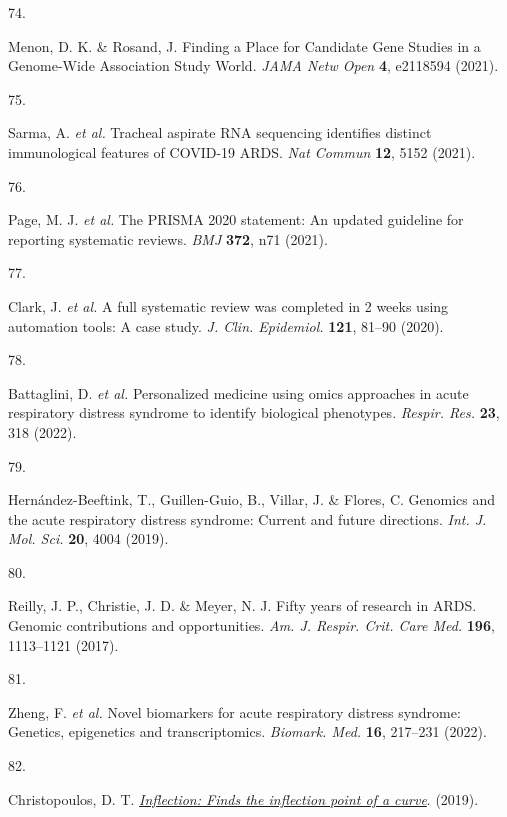 \documentclass[
  11,
  a4paper,
]{article}
\newlength{\cslhangindent}
\newlength{\csllabelwidth}
\newlength{\cslentryspacingunit} %
\newenvironment{CSLReferences}[2] %
 {%
  \setlength{\parindent}{0pt}
  \ifodd #1
  \let\oldpar\par
  \def\par{\hangindent=\cslhangindent\oldpar}
  \fi
  \setlength{\parskip}{#2\cslentryspacingunit}
 }%
 {}
\newcommand{\CSLLeftMargin}[1]{\parbox[t]{\csllabelwidth}{#1}}
\newcommand{\CSLRightInline}[1]{\parbox[t]{\linewidth - \csllabelwidth}{#1}\break}
\begin{document}
\begin{CSLReferences}{0}{0}
\leavevmode{}%
\CSLLeftMargin{74. }%
\CSLRightInline{Menon, D. K. \& Rosand, J. {{F}inding a {P}lace for
{C}andidate {G}ene {S}tudies in a {G}enome-{W}ide {A}ssociation {S}tudy
{W}orld}. \emph{JAMA Netw Open} \textbf{4}, e2118594 (2021).}

\leavevmode{}%
\CSLLeftMargin{75. }%
\CSLRightInline{Sarma, A. \emph{et al.} {{T}racheal aspirate {R}{N}{A}
sequencing identifies distinct immunological features of
{C}{O}{V}{I}{D}-19 {A}{R}{D}{S}}. \emph{Nat Commun} \textbf{12}, 5152
(2021).}

\leavevmode{}%
\CSLLeftMargin{76. }%
\CSLRightInline{Page, M. J. \emph{et al.} The {PRISMA} 2020 statement:
An updated guideline for reporting systematic reviews. \emph{BMJ}
\textbf{372}, n71 (2021).}

\leavevmode{}%
\CSLLeftMargin{77. }%
\CSLRightInline{Clark, J. \emph{et al.} A full systematic review was
completed in 2 weeks using automation tools: A case study. \emph{J.
Clin. Epidemiol.} \textbf{121}, 81--90 (2020).}

\leavevmode{}%
\CSLLeftMargin{78. }%
\CSLRightInline{Battaglini, D. \emph{et al.} Personalized medicine using
omics approaches in acute respiratory distress syndrome to identify
biological phenotypes. \emph{Respir. Res.} \textbf{23}, 318 (2022).}

\leavevmode{}%
\CSLLeftMargin{79. }%
\CSLRightInline{Hernández-Beeftink, T., Guillen-Guio, B., Villar, J. \&
Flores, C. Genomics and the acute respiratory distress syndrome: Current
and future directions. \emph{Int. J. Mol. Sci.} \textbf{20}, 4004
(2019).}

\leavevmode{}%
\CSLLeftMargin{80. }%
\CSLRightInline{Reilly, J. P., Christie, J. D. \& Meyer, N. J. Fifty
years of research in {ARDS}. Genomic contributions and opportunities.
\emph{Am. J. Respir. Crit. Care Med.} \textbf{196}, 1113--1121 (2017).}

\leavevmode{}%
\CSLLeftMargin{81. }%
\CSLRightInline{Zheng, F. \emph{et al.} Novel biomarkers for acute
respiratory distress syndrome: Genetics, epigenetics and
transcriptomics. \emph{Biomark. Med.} \textbf{16}, 217--231 (2022).}

\leavevmode{}%
\CSLLeftMargin{82. }%
\CSLRightInline{Christopoulos, D. T.
\emph{\href{https://CRAN.R-project.org/package=inflection}{Inflection:
Finds the inflection point of a curve}}. (2019).}


\end{CSLReferences}
\end{document}
